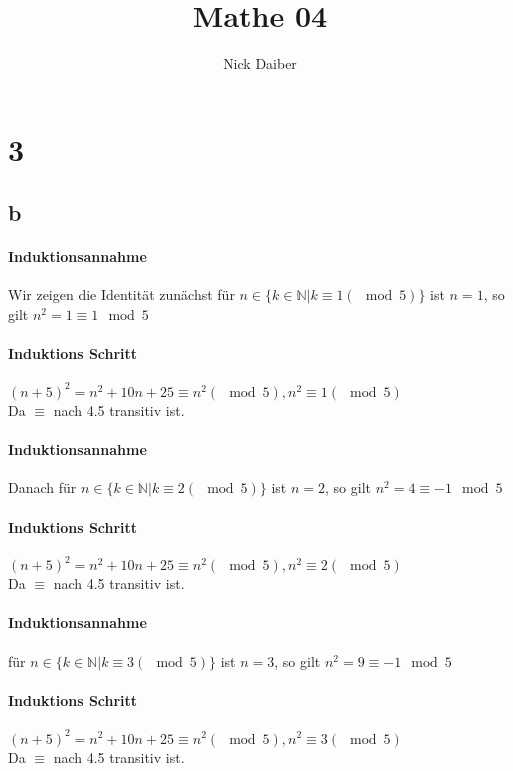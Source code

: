 \documentclass{article}
\author{Nick Daiber}
\title{Mathe 04}
\begin{document}
\maketitle
\section*{3}
\subsection*{b}
\paragraph{Induktionsannahme\\}
Wir zeigen die Identität zunächst für $n\in\{k\in \mathbb N|k\equiv 1 (\mod 5)\}$
ist $n = 1$, so gilt $n^2 = 1 \equiv 1 \mod 5$\\
\paragraph{Induktions Schritt\\}
$(n+5)^2=n^2+10n+25\equiv n^2 (\mod 5), n^2 \equiv 1(\mod 5)$\\
Da $\equiv$ nach 4.5 transitiv ist.

\paragraph{Induktionsannahme\\}
Danach für $n\in\{k\in \mathbb N|k\equiv 2 (\mod 5)\}$
ist $n = 2$, so gilt $n^2 = 4 \equiv -1 \mod 5$\\
\paragraph{Induktions Schritt\\}
$(n+5)^2=n^2+10n+25\equiv n^2 (\mod 5), n^2 \equiv 2(\mod 5)$\\
Da $\equiv$ nach 4.5 transitiv ist.

\paragraph{Induktionsannahme\\}
für $n\in\{k\in \mathbb N|k\equiv 3 (\mod 5)\}$
ist $n = 3$, so gilt $n^2 = 9 \equiv -1 \mod 5$\\
\paragraph{Induktions Schritt\\}
$(n+5)^2=n^2+10n+25\equiv n^2 (\mod 5), n^2 \equiv 3(\mod 5)$\\
Da $\equiv$ nach 4.5 transitiv ist.
\end{document}
